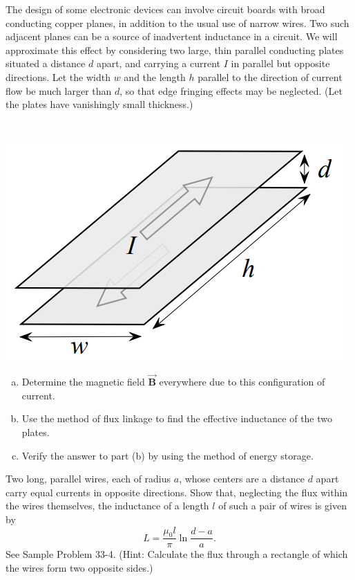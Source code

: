 \documentclass[12pt,letterpaper]{hmcpset}
\begin{document}
	\begin{problem}[SUP 8.1:]
		The design of some electronic devices can involve circuit boards with broad conducting copper planes, in addition to the usual use of narrow wires.
		Two such adjacent planes can be a source of inadvertent inductance in a circuit.
		We will approximate this effect by considering two large, thin parallel conducting plates situated a distance $d$ apart, and carrying a current $I$ in parallel but opposite directions.
		Let the width $w$ and the length $h$ parallel to the direction of current flow be much larger than $d$, so that edge fringing effects may be neglected.
		(Let the plates have vanishingly small thickness.)

		\

		\centering\includegraphics[scale = 0.6]{Sup_8-1}
		
		\begin{enumerate}[(a)]
			\item Determine the magnetic field $\vec{\mathbf{B}}$ everywhere due to this configuration of current.
			\item Use the method of flux linkage to find the effective inductance of the two plates.
			\item Verify the answer to part (b) by using the method of energy storage.
		\end{enumerate}
	\end{problem}
	\clearpage



	\begin{problem}[36P3:]
		Two long, parallel wires, each of radius $a$, whose centers are a distance $d$ apart carry equal currents in opposite directions.
		Show that, neglecting the flux within the wires themselves, the inductance of a length $l$ of such a pair of wires is given by
		\[L = \frac{\mu_0l}{\pi}\ln{\frac{d - a}{a}}.\]
		See Sample Problem 33-4. (Hint: Calculate the flux through a rectangle of which the wires form two opposite sides.)
	\end{problem}
	\clearpage
\end{document}
